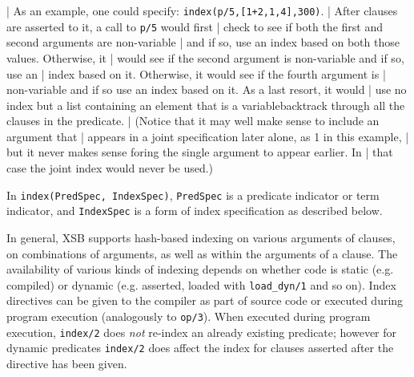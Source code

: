 \begin{description}
{| As an example, one could specify: {\tt index(p/5,[1+2,1,4],300)}.
| After clauses are asserted to it, a call to {\tt p/5} would first
| check to see if both the first and second arguments are non-variable
| and if so, use an index based on both those values. Otherwise, it
| would see if the second argument is non-variable and if so, use an
| index based on it. Otherwise, it would see if the fourth argument is
| non-variable and if so use an index based on it. As a last resort, it would
| use no index but a list containing an element that is a variablebacktrack through all the clauses in the predicate.
| (Notice that it may well make sense to include an argument that 
| appears in a joint specification later alone, as 1 in this example,
| but it never makes sense foring the single argument to appear earlier. In
| that case the joint index would never be used.)

}

\label{index_dynamic} 
%
In {\tt index(PredSpec, IndexSpec)}, {\tt PredSpec} is a predicate
indicator or term indicator, and {\tt IndexSpec} is a form of index
specification as described below.

In general, XSB supports hash-based indexing on various arguments of
clauses, on combinations of arguments, as well as within the arguments
of a clause.  The availability of various kinds of indexing depends on
whether code is static (e.g. compiled) or dynamic (e.g. asserted,
loaded with {\tt load\_dyn/1} and so on).  Index directives can be
given to the compiler as part of source code or executed during
program execution (analogously to {\tt op/3}).  When executed during
program execution, {\tt index/2} does {\em not\/} re-index an already
existing predicate; however for dynamic predicates {\tt index/2} does
affect the index for clauses asserted after the directive has been
given.


\end{description}
